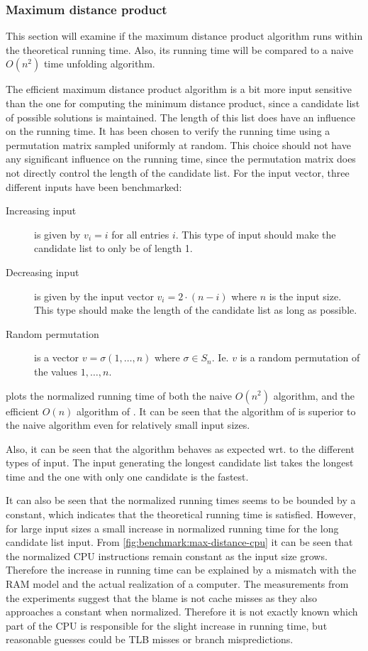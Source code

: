 \documentclass[twoside,11pt,openright]{report}
\begin{document}
\subsubsection{Maximum distance product}
This section will examine if the maximum distance product algorithm runs within the theoretical running time. Also, its running time will be compared to a naive $O(n^2)$ time unfolding algorithm.

The efficient maximum distance product algorithm is a bit more input sensitive than the one for computing the minimum distance product, since a candidate list of possible solutions is maintained. The length of this list does have an influence on the running time. It has been chosen to verify the running time using a permutation matrix sampled uniformly at random. This choice should not have any significant influence on the running time, since the permutation matrix does not directly control the length of the candidate list. For the input vector, three different inputs have been benchmarked:
\begin{description}
  \item[Increasing input] is given by $v_i = i$ for all entries $i$. This type of input should make the candidate list to only be of length 1.
  \item[Decreasing input] is given by the input vector $v_i = 2 \cdot (n - i)$ where $n$ is the input size. This type should make the length of the candidate list as long as possible.
  \item[Random permutation] is a vector $v = \sigma(1, \dots, n)$ where $\sigma \in S_n$. Ie. $v$ is a random permutation of the values $1, \dots, n$.
\end{description}
 plots the normalized running time of both the naive $O(n^2)$ algorithm, and the efficient $O(n)$ algorithm of \cite{Gawrychowski:2012:FAC:2422024.2422048}. It can be seen that the algorithm of \cite{Gawrychowski:2012:FAC:2422024.2422048} is superior to the naive algorithm even for relatively small input sizes.

Also, it can be seen that the algorithm behaves as expected wrt. to the different types of input. The input generating the longest candidate list takes the longest time and the one with only one candidate is the fastest.

It can also be seen that the normalized running times seems to be bounded by a constant, which indicates that the theoretical running time is satisfied. However, for large input sizes a small increase in normalized running time for the long candidate list input. From \cref{fig:benchmark:max-distance-cpu} it can be seen that the normalized CPU instructions remain constant as the input size grows. Therefore the increase in running time can be explained by a mismatch with the RAM model and the actual realization of a computer. The measurements from the experiments suggest that the blame is not cache misses as they also approaches a constant when normalized. Therefore it is not exactly known which part of the CPU is responsible for the slight increase in running time, but reasonable guesses could be TLB misses or branch mispredictions.
\end{document}
